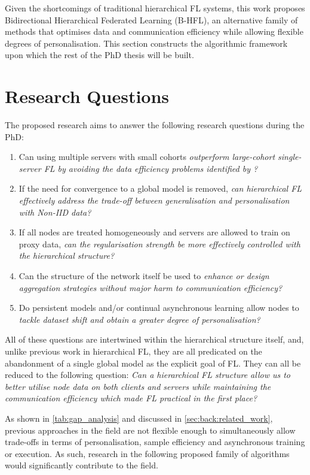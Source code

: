 
Given the shortcomings of traditional hierarchical FL systems, this work proposes Bidirectional Hierarchical Federated Learning (B-HFL), an alternative family of methods that optimises data and communication efficiency while allowing flexible degrees of personalisation. This section constructs the algorithmic framework upon which the rest of the PhD thesis will be built.

\section{Research Questions}\label{sec:proposal:research_questions}
The proposed research aims to answer the following research questions during the PhD:
\begin{singlespace*}
    \begin{enumerate}
        \item Can using multiple servers with small cohorts \emph{outperform large-cohort single-server FL by avoiding the data efficiency problems identified by \citet{LargeCohorts}?}
        \item If the need for convergence to a global model is removed, \emph{can hierarchical FL effectively address the trade-off between generalisation and personalisation with Non-IID data?}
        \item If all nodes are treated homogeneously and servers are allowed to train on proxy data, \emph{can the regularisation strength be more effectively controlled with the hierarchical structure?}
        \item Can the structure of the network itself be used to \emph{enhance or design aggregation strategies without major harm to communication efficiency?}
        \item Do persistent models and/or continual asynchronous learning allow nodes to \emph{tackle dataset shift and obtain a greater degree of personalisation?}
    \end{enumerate}
\end{singlespace*}
All of these questions are intertwined within the hierarchical structure itself, and, unlike previous work in hierarchical FL, they are all predicated on the abandonment of a single global model as the explicit goal of FL\@. They can all be reduced to the following question: \emph{Can a hierarchical FL structure allow us to better utilise node data on both clients and servers while maintaining the communication efficiency which made FL practical in the first place?}

As shown in \cref{tab:gap_analysis} and discussed in \cref{sec:back:related_work}, previous approaches in the field are not flexible enough to simultaneously allow trade-offs in terms of personalisation, sample efficiency and asynchronous training or execution. As such, research in the following proposed family of algorithms would significantly contribute to the field.
